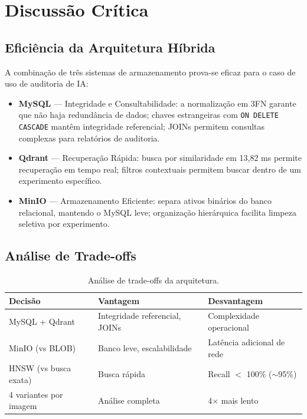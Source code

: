 \documentclass[12pt,a4paper,twoside]{article}
\begin{document}
\section{Discussão Crítica}
\label{sec:discussao}

\subsection{Eficiência da Arquitetura Híbrida}

A combinação de três sistemas de armazenamento prova-se eficaz para o caso de uso de auditoria de IA:

\begin{itemize}
    \item \textbf{MySQL} --- Integridade e Consultabilidade: a normalização em 3FN garante que não haja redundância de dados; chaves estrangeiras com \texttt{ON DELETE CASCADE} mantêm integridade referencial; JOINs permitem consultas complexas para relatórios de auditoria.
    \item \textbf{Qdrant} --- Recuperação Rápida: busca por similaridade em 13,82 ms permite recuperação em tempo real; filtros contextuais permitem buscar dentro de um experimento específico.
    \item \textbf{MinIO} --- Armazenamento Eficiente: separa ativos binários do banco relacional, mantendo o MySQL leve; organização hierárquica facilita limpeza seletiva por experimento.
\end{itemize}

\subsection{Análise de Trade-offs}

\begin{table}[H]
\centering
\caption{Análise de trade-offs da arquitetura.}
\label{tab:tradeoffs}
\begin{tabular}{@{}lp{4cm}p{4cm}@{}}
\toprule
\textbf{Decisão} & \textbf{Vantagem} & \textbf{Desvantagem} \\
\midrule
MySQL + Qdrant & Integridade referencial, JOINs & Complexidade operacional \\
MinIO (vs BLOB) & Banco leve, escalabilidade & Latência adicional de rede \\
HNSW (vs busca exata) & Busca rápida & Recall $<$ 100\% ($\sim$95\%) \\
4 variantes por imagem & Análise completa & 4$\times$ mais lento \\
\bottomrule
\end{tabular}
\end{table}
\end{document}
